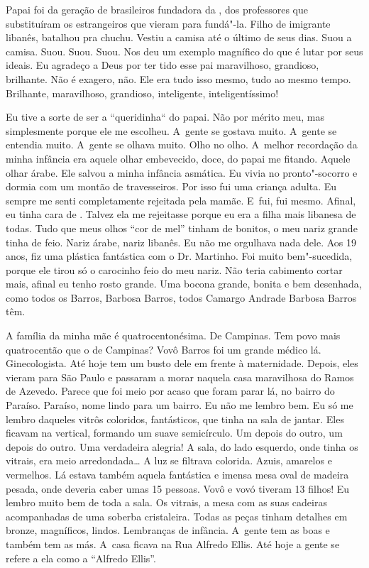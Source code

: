 Papai foi da geração de brasileiros fundadora da , dos professores
que substituíram os estrangeiros que vieram para fundá"-la. Filho de
imigrante libanês, batalhou pra chuchu. Vestiu a camisa até o último de
seus dias. Suou a camisa. Suou. Suou. Suou. Nos deu um exemplo magnífico
do que é lutar por seus ideais. Eu agradeço a Deus por ter tido esse pai
maravilhoso, grandioso, brilhante. Não é exagero, não. Ele era tudo isso
mesmo, tudo ao mesmo tempo. Brilhante, maravilhoso, grandioso,
inteligente, inteligentíssimo!

Eu tive a sorte de ser a ``queridinha`` do papai. Não por mérito meu,
mas simplesmente porque ele me escolheu. A~gente se gostava muito. A~gente se entendia muito. A~gente se olhava muito. Olho no olho. A~melhor
recordação da minha infância era aquele olhar embevecido, doce, do papai
me fitando. Aquele olhar árabe. Ele salvou a minha infância asmática. Eu
vivia no pronto"-socorro e dormia com um montão de travesseiros. Por isso
fui uma criança adulta. Eu sempre me senti completamente rejeitada pela
mamãe. E~fui, fui mesmo. Afinal, eu tinha cara de . Talvez ela me
rejeitasse porque eu era a filha mais libanesa de todas. Tudo que meus
olhos ``cor de mel'' tinham de bonitos, o meu nariz grande tinha de
feio. Nariz árabe, nariz libanês. Eu não me orgulhava nada dele. Aos 19
anos, fiz uma plástica fantástica com o Dr. Martinho. Foi muito
bem"-sucedida, porque ele tirou só o carocinho feio do meu nariz. Não
teria cabimento cortar mais, afinal eu tenho rosto grande. Uma bocona
grande, bonita e bem desenhada, como todos os Barros, Barbosa Barros,
todos Camargo Andrade Barbosa Barros têm.

A família da minha mãe é quatrocentonésima. De Campinas. Tem povo mais
quatrocentão que o de Campinas? Vovô Barros foi um grande médico lá.
Ginecologista. Até hoje tem um busto dele em frente à maternidade.
Depois, eles vieram para São Paulo e passaram a morar naquela casa
maravilhosa do Ramos de Azevedo. Parece que foi meio por acaso que foram
parar lá, no bairro do Paraíso. Paraíso, nome lindo para um bairro. Eu
não me lembro bem. Eu só me lembro daqueles vitrôs coloridos,
fantásticos, que tinha na sala de jantar. Eles ficavam na vertical,
formando um suave semicírculo. Um depois do outro, um depois do outro.
Uma verdadeira alegria! A sala, do lado esquerdo, onde tinha os vitrais,
era meio arredondada… A luz se filtrava colorida. Azuis, amarelos
e vermelhos. Lá estava também aquela fantástica e imensa mesa oval de
madeira pesada, onde deveria caber umas 15 pessoas. Vovô e vovó tiveram
13 filhos! Eu lembro muito bem de toda a sala. Os vitrais, a mesa com as
suas cadeiras acompanhadas de uma soberba cristaleira. Todas as peças
tinham detalhes em bronze, magníficos, lindos. Lembranças de infância. A~gente tem as boas e também tem as más. A~casa ficava na Rua Alfredo
Ellis. Até hoje a gente se refere a ela como a ``Alfredo Ellis''.

